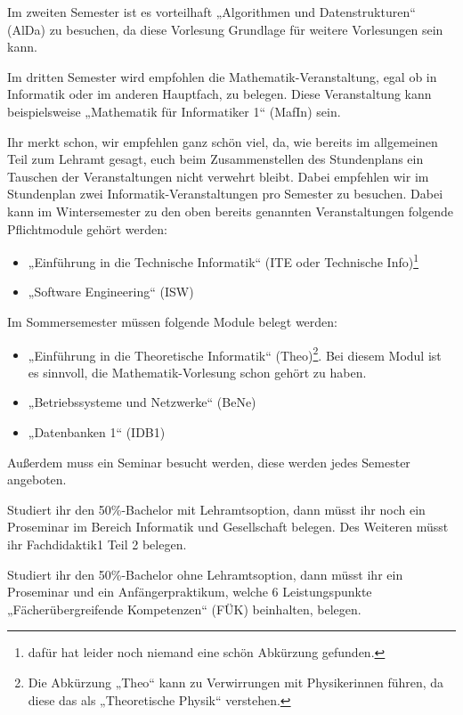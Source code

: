 Im zweiten Semester ist es vorteilhaft „Algorithmen und Datenstrukturen“ (\gls{AlDa}) zu besuchen, da diese Vorlesung Grundlage für weitere Vorlesungen sein kann. 

Im dritten Semester wird empfohlen die Mathematik-Veranstaltung, egal ob in Informatik oder im anderen Hauptfach, zu belegen. Diese Veranstaltung kann beispielsweise „Mathematik für Informatiker 1“ (\gls{MafIn}) sein.

Ihr merkt schon, wir empfehlen ganz schön viel, da, wie bereits im allgemeinen Teil zum Lehramt gesagt, euch beim Zusammenstellen des Stundenplans ein Tauschen der Veranstaltungen nicht verwehrt bleibt. Dabei empfehlen wir im Stundenplan zwei Informatik-Veranstaltungen pro Semester zu besuchen. Dabei kann im Wintersemester zu den oben bereits genannten Veranstaltungen folgende Pflichtmodule gehört werden: 
\begin{itemize}
    \item „Einführung in die Technische Informatik“ (\gls{ITE} oder Technische Info)\footnote{dafür hat leider noch niemand eine schön Abkürzung gefunden.}
    \item „Software Engineering“ (\gls{ISW})
\end{itemize}
Im Sommersemester müssen folgende Module belegt werden:
\begin{itemize}
    \item „Einführung in die Theoretische Informatik“ (\gls{Theo})\footnote{Die Abkürzung „Theo“ kann zu Verwirrungen mit Physikerinnen führen, da diese das als „Theoretische Physik“ verstehen.}. Bei diesem Modul ist es sinnvoll, die Mathematik-Vorlesung schon gehört zu haben.
    \item „Betriebssysteme und Netzwerke“ (\gls{BeNe})
    \item „Datenbanken 1“ (\gls{IDB1})
\end{itemize}
Außerdem muss ein Seminar besucht werden, diese werden jedes Semester angeboten. 

Studiert ihr den 50\%-Bachelor mit Lehramtsoption, dann müsst ihr noch ein Proseminar im Bereich Informatik und Gesellschaft belegen. Des Weiteren müsst ihr Fachdidaktik1 Teil 2 belegen. 

Studiert ihr den 50\%-Bachelor ohne Lehramtsoption, dann müsst ihr ein Proseminar und ein Anfängerpraktikum, welche 6 Leistungspunkte „Fächerübergreifende Kompetenzen“ (FÜK) beinhalten, belegen. 

